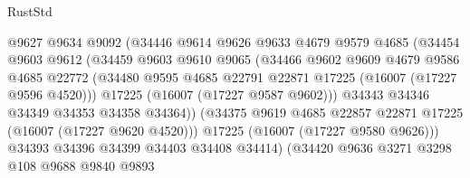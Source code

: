 \begin{lexlean}{RustStd}
\begin{coremodule}
                              @9627
                              @9634
                              @9092
                              (@34446
                                @9614
                                @9626
                                @9633
                                @4679
                                @9579
                                @4685
                                (@34454
                                  @9603
                                  @9612
                                  (@34459
                                    @9603
                                    @9610
                                    @9065
                                    (@34466
                                      @9602
                                      @9609
                                      @4679
                                      @9586
                                      @4685
                                      @22772
                                      (@34480
                                        @9595
                                        @4685
                                        @22791
                                        @22871
                                        @17225
                                        (@16007 (@17227 @9596 @4520)))
                                      @17225
                                      (@16007 (@17227 @9587 @9602)))
                                    @34343
                                    @34346
                                    @34349
                                    @34353
                                    @34358
                                    @34364))
                                (@34375
                                  @9619
                                  @4685
                                  @22857
                                  @22871
                                  @17225
                                  (@16007 (@17227 @9620 @4520)))
                                @17225
                                (@16007 (@17227 @9580 @9626)))
                              @34393
                              @34396
                              @34399
                              @34403
                              @34408
                              @34414)
                            (@34420
                              @9636
                              @3271
                              @3298
                              @108
                              @9688
                              @9840
                              @9893

\end{coremodule}
\end{lexlean}
